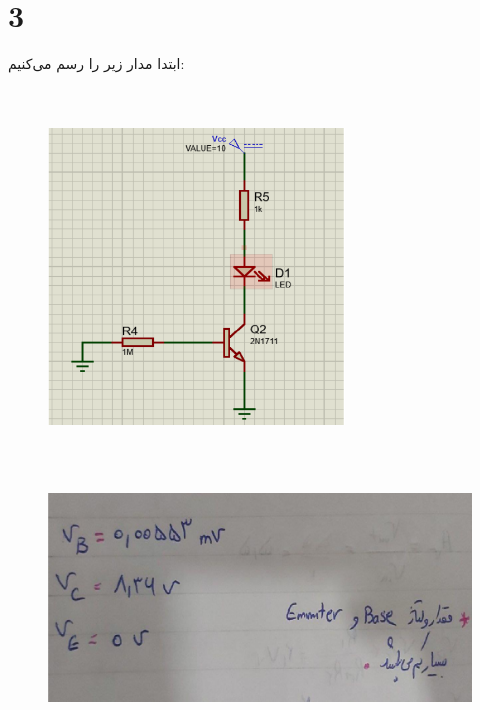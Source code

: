 \documentclass[12pt]{article}
\begin{document}
\clearpage
\section{3}
ابتدا مدار زیر را رسم می‌کنیم:
\begin{figure}[H]
	\begin{center}
		\includegraphics[width=0.7\textwidth, height=10cm]{./images/9.5}
	\end{center}
\end{figure}
\begin{figure}[H]
	\begin{center}
		\includegraphics[width=\textwidth, height=6cm]{./images/9.5.1}
	\end{center}
\end{figure}
\end{document}
